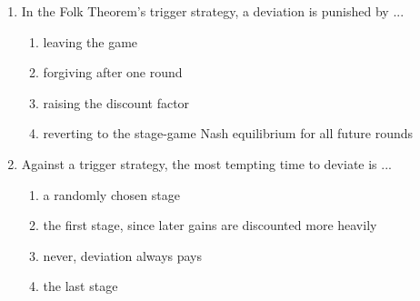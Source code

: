 \documentclass[11pt]{article}
\begin{document}
\begin{enumerate}[itemsep=6pt]
  \item In the Folk Theorem's trigger strategy, a deviation is punished by ...
  \begin{enumerate}
    \item leaving the game
    \item forgiving after one round
    \item raising the discount factor
    \item reverting to the stage-game Nash equilibrium for all future rounds
  \end{enumerate}
  \item Against a trigger strategy, the most tempting time to deviate is ...
  \begin{enumerate}
    \item a randomly chosen stage
    \item the first stage, since later gains are discounted more heavily
    \item never, deviation always pays
    \item the last stage
  \end{enumerate}
\end{enumerate}
\end{document}
